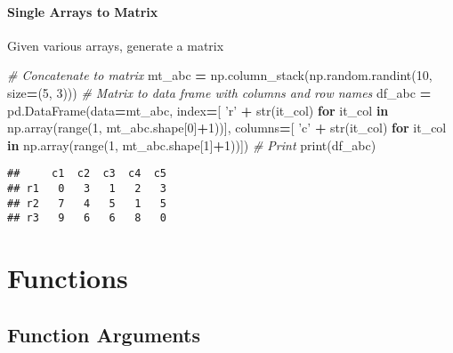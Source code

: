 \documentclass[
]{book}
\newenvironment{Shaded}{\begin{snugshade}}{\end{snugshade}}
\newcommand{\BuiltInTok}[1]{#1}
\newcommand{\CommentTok}[1]{\textcolor[rgb]{0.56,0.35,0.01}{\textit{#1}}}
\newcommand{\ControlFlowTok}[1]{\textcolor[rgb]{0.13,0.29,0.53}{\textbf{#1}}}
\newcommand{\DecValTok}[1]{\textcolor[rgb]{0.00,0.00,0.81}{#1}}
\newcommand{\KeywordTok}[1]{\textcolor[rgb]{0.13,0.29,0.53}{\textbf{#1}}}
\newcommand{\NormalTok}[1]{#1}
\newcommand{\OperatorTok}[1]{\textcolor[rgb]{0.81,0.36,0.00}{\textbf{#1}}}
\newcommand{\StringTok}[1]{\textcolor[rgb]{0.31,0.60,0.02}{#1}}
\begin{document}
\hypertarget{single-arrays-to-matrix}{%
\subsubsection{Single Arrays to Matrix}\label{single-arrays-to-matrix}}

Given various arrays, generate a matrix

\begin{Shaded}
\begin{Highlighting}[]
\CommentTok{# Concatenate to matrix}
\NormalTok{mt_abc }\OperatorTok{=}\NormalTok{ np.column_stack(np.random.randint(}\DecValTok{10}\NormalTok{, size}\OperatorTok{=}\NormalTok{(}\DecValTok{5}\NormalTok{, }\DecValTok{3}\NormalTok{)))}
\CommentTok{# Matrix to data frame with columns and row names}
\NormalTok{df_abc }\OperatorTok{=}\NormalTok{ pd.DataFrame(data}\OperatorTok{=}\NormalTok{mt_abc,}
\NormalTok{            index}\OperatorTok{=}\NormalTok{[ }\StringTok{'r'} \OperatorTok{+} \BuiltInTok{str}\NormalTok{(it_col) }\ControlFlowTok{for}\NormalTok{ it_col }\KeywordTok{in}\NormalTok{ np.array(}\BuiltInTok{range}\NormalTok{(}\DecValTok{1}\NormalTok{, mt_abc.shape[}\DecValTok{0}\NormalTok{]}\OperatorTok{+}\DecValTok{1}\NormalTok{))],}
\NormalTok{            columns}\OperatorTok{=}\NormalTok{[ }\StringTok{'c'} \OperatorTok{+} \BuiltInTok{str}\NormalTok{(it_col) }\ControlFlowTok{for}\NormalTok{ it_col }\KeywordTok{in}\NormalTok{ np.array(}\BuiltInTok{range}\NormalTok{(}\DecValTok{1}\NormalTok{, mt_abc.shape[}\DecValTok{1}\NormalTok{]}\OperatorTok{+}\DecValTok{1}\NormalTok{))])}
\CommentTok{# Print}
\BuiltInTok{print}\NormalTok{(df_abc)}
\end{Highlighting}
\end{Shaded}

\begin{verbatim}
##     c1  c2  c3  c4  c5
## r1   0   3   1   2   3
## r2   7   4   5   1   5
## r3   9   6   6   8   0
\end{verbatim}

\hypertarget{functions}{%
\chapter{Functions}\label{functions}}

\hypertarget{function-arguments}{%
\section{Function Arguments}\label{function-arguments}}
\end{document}
